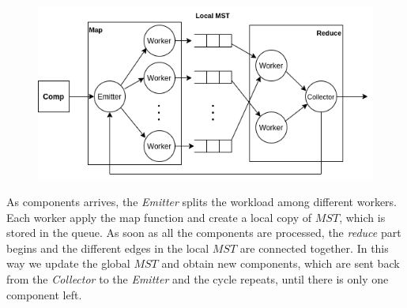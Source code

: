 \documentclass[notitlepage]{article}
\begin{document}
\begin{figure}[H]
  \centering\includegraphics[scale=0.7]{pics/parallel_schema.png}
\end{figure}

As components arrives, the {\itshape Emitter} splits the workload among different workers. Each worker apply the map function and create a local copy of $MST$, which is stored in the queue. As soon as 
all the components are processed, the {\itshape reduce} part begins and the different edges in the local $MST$ are connected together. In this way we update the global $MST$ and obtain new components, 
which are sent back from the {\itshape Collector} to the {\itshape Emitter} and the cycle repeats, until there is only one component left.
\end{document}

